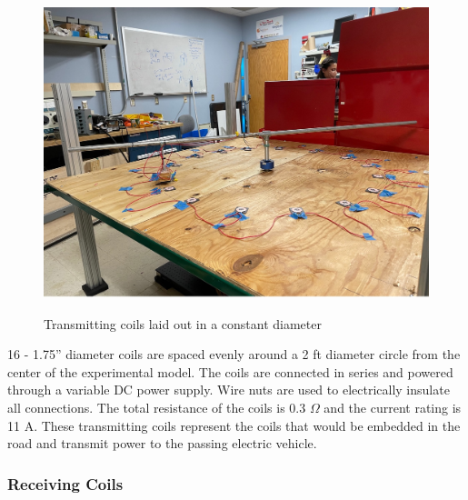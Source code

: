\begin{figure}
    \begin{center}
    \includegraphics[width=5in]{fig7.jpg}
    \end{center}
    \renewcommand{\baselinestretch}{1}
    \small\normalsize
    \begin{quote}
    \caption[Transmitting coils laid out in a constant diameter]{Transmitting coils laid out in a constant diameter} \label{fig: f7}
    \end{quote}
\end{figure}

16 - 1.75” diameter coils are spaced evenly around a 2 ft diameter circle from the center of the experimental model. 
The coils are connected in series and powered through a variable DC power supply. Wire nuts are used to 
electrically insulate all connections. The total resistance of the coils is 0.3 $\Omega$ and the current 
rating is 11 A. These transmitting coils represent the coils that would be embedded in the road and transmit 
power to the passing electric vehicle.

\subsubsection{Receiving Coils}
 
